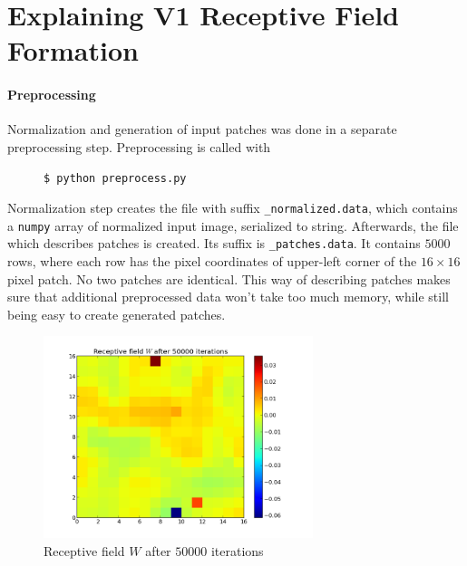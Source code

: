 \section{Explaining V1 Receptive Field Formation}

\paragraph{Preprocessing}
Normalization and generation of input patches was done in a separate
preprocessing step. Preprocessing is called with
\begin{figure}[!htbl]
    \begin{verbatim}
$ python preprocess.py
\end{verbatim}
\end{figure}

Normalization step creates the file with suffix \texttt{\_normalized.data},
which contains a \texttt{numpy} array of normalized input image, serialized to
string. Afterwards, the file which describes patches is created. Its suffix is
\texttt{\_patches.data}. It contains $5000$ rows, where each row has the pixel
coordinates of upper-left corner of the $16\times16$ pixel patch. No two
patches are identical. This way of describing patches makes sure that additional
preprocessed data won't take too much memory, while still being easy to create
generated patches.

\begin{figure}[h]
\centering
\includegraphics[width=0.7\textwidth]{../ex3/results1/img06}
\caption{}
\caption{Receptive field $W$ after $50000$ iterations}
\label{fig:img06}
\end{figure}

